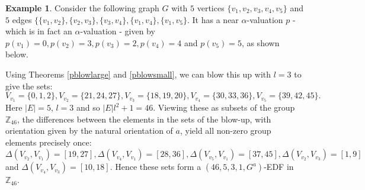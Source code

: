 \documentclass[12pt, a4paper]{article}
\theoremstyle{definition}
\newtheorem{example}[theorem]{Example}
\begin{document}
\begin{example}
Consider the following graph $G$ with $5$ vertices $\{v_1,v_2,v_3,v_4,v_5\}$ and $5$ edges $\{\{v_1,v_2\}, \{v_2,v_3\}, \{v_3,v_4\}, \{v_1,v_4\}, \{v_1,v_5\}$. It has a near $\alpha$-valuation $p$ - which is in fact an $\alpha$-valuation - given by $p(v_1)=0,p(v_2)=3, p(v_3)=2, p(v_4)=4$ and $p(v_5)=5$, as shown below.  
\begin{center}  
\end{center}
Using Theorems \ref{pblowlarge} and \ref{pblowsmall}, we can blow this up with $l=3$ to give the sets:
\[V_{v_1}=\{0,1,2\}, V_{v_2}=\{21,24,27\}, V_{v_3}=\{18,19,20\},V_{v_4}=\{30,33,36\},V_{v_5}=\{39,42,45\}.\]
Here $|E|=5$, $l=3$ and so $|E|l^2+1=46$.  Viewing these as subsets of the group  $\mathbb{Z}_{46}$, the differences between the elements in the sets of the blow-up, with orientation given by the natural orientation of $ a$, yield all non-zero group elements precisely once: $\Delta(V_{v_2},V_{v_1})=[19,27],\Delta(V_{v_4},V_{v_1})=[28,36],
\Delta(V_{v_5},V_{v_1})=[37,45],\Delta(V_{v_2},V_{v_3})=[1,9]$ and $\Delta(V_{v_4},V_{v_3})=[10,18]$.
Hence these sets form a $(46,5,3,1,G^a)$-EDF in $\mathbb{Z}_{46}$.
\end{example}
\end{document}
